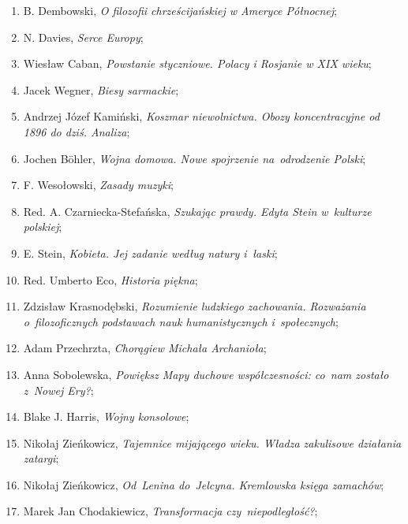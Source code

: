 \documentclass[a4paper,11pt]{article}
\begin{document}
\begin{enumerate}
\item B. Dembowski, \emph{O filozofii chrześcijańskiej w Ameryce
    Północnej};

\item N. Davies, \emph{Serce Europy};

\item Wiesław Caban, \emph{Powstanie styczniowe. Polacy i Rosjanie w
    XIX wieku};

\item Jacek Wegner, \emph{Biesy sarmackie};

\item Andrzej Józef Kamiński, \emph{Koszmar niewolnictwa. Obozy
    koncentracyjne od 1896 do dziś. Analiza};

\item Jochen B\"{o}hler, \emph{Wojna domowa. Nowe spojrzenie
    na~odrodzenie Polski};

\item F. Wesołowski, \emph{Zasady muzyki};

\item Red. A. Czarniecka-Stefańska, \emph{Szukając prawdy. Edyta Stein
    w~kulturze polskiej};

\item E. Stein, \emph{Kobieta. Jej zadanie według natury i~łaski};

\item Red. Umberto Eco, \emph{Historia piękna};

\item Zdzisław Krasnodębski, \emph{Rozumienie ludzkiego zachowania.
    Rozważania o~filozoficznych podstawach nauk humanistycznych
    i~społecznych};

\item Adam Przechrzta, \emph{Chorągiew Michała Archanioła};

\item Anna Sobolewska, \emph{Powiększ Mapy duchowe współczesności:
    co~nam zostało z~Nowej Ery?};

\item Blake J. Harris, \emph{Wojny konsolowe};

\item Nikołaj Zieńkowicz, \emph{Tajemnice mijającego wieku. Władza
    zakulisowe działania zatargi};

\item Nikołaj Zieńkowicz, \emph{Od~Lenina do~Jelcyna. Kremlowska
    księga zamachów};

\item Marek Jan Chodakiewicz, \emph{Transformacja czy~niepodległość?};


\end{enumerate}
\end{document}
